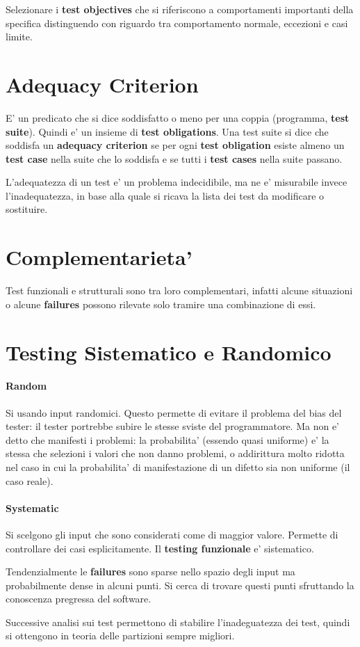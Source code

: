 Selezionare i \textbf{test objectives} che si riferiscono a comportamenti importanti della specifica distinguendo con riguardo tra comportamento normale, eccezioni e casi limite.

\section{Adequacy Criterion}

E' un predicato che si dice soddisfatto o meno per una coppia (programma, \textbf{test suite}).
Quindi e' un insieme di \textbf{test obligations}.
Una test suite si dice che soddisfa un \textbf{adequacy criterion} se per ogni \textbf{test obligation} esiste almeno un \textbf{test case} nella suite che lo soddisfa e se tutti i \textbf{test cases} nella suite passano.

L'adequatezza di un test e' un problema indecidibile, ma ne e' misurabile invece l'inadequatezza, in base alla quale si ricava la lista dei test da modificare o sostituire.

\section{Complementarieta'}

Test funzionali e strutturali sono tra loro complementari, infatti alcune situazioni o alcune \textbf{failures} possono rilevate solo tramire una combinazione di essi.

\section{Testing Sistematico e Randomico}

\paragraph{Random}

Si usando input randomici. Questo permette di evitare il problema del bias del tester: il tester portrebbe subire le stesse sviste del programmatore. Ma non e' detto che manifesti i problemi: la probabilita' (essendo quasi uniforme) e' la stessa che selezioni i valori che non danno problemi, o addirittura molto ridotta nel caso in cui la probabilita' di manifestazione di un difetto sia non uniforme (il caso reale).

\paragraph{Systematic}

Si scelgono gli input che sono considerati come di maggior valore. Permette di controllare dei casi esplicitamente.
Il \textbf{testing funzionale} e' sistematico.

Tendenzialmente le \textbf{failures} sono sparse nello spazio degli input ma probabilmente dense in alcuni punti. Si cerca di trovare questi punti sfruttando la conoscenza pregressa del software.

Successive analisi sui test permettono di stabilire l'inadeguatezza dei test, quindi si ottengono in teoria delle partizioni sempre migliori.
